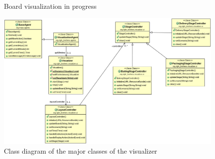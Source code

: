 \documentclass[12pt]{article}
\begin{document}
\begin{itemize}
\begin{figure}[H]
    \caption{Board visualization in progress}\label{fig:visualizer-ui}
\end{figure}
\begin{figure}[H]
    \centering
    \includegraphics[width=1.0\linewidth]{class-diagram.png}
    \caption{Class diagram of the major classes of the visualizer}\label{fig:class_diagram_for_visualiser}
\end{figure}

\end{itemize}
\end{document}
